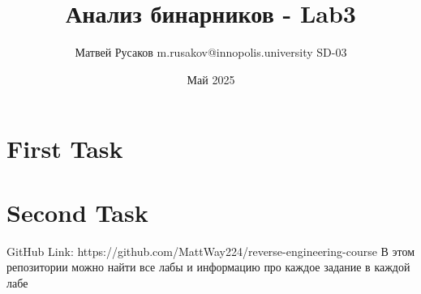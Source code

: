 \usepackage{hyperref}
\usepackage[utf8]{inputenc}
\usepackage[T2A]{fontenc}
\usepackage[top=5cm,bottom=3cm,right=3cm,left=3cm]{geometry}
\usepackage{graphicx}

\title{Анализ бинарников - Lab3}
\author{Матвей Русаков m.rusakov@innopolis.university SD-03}
\date{Май 2025}



    \maketitle


    \section{First Task}
    


    \section{Second Task}
    

    \begin{thebibliography}{1}
        GitHub Link: https://github.com/MattWay224/reverse-engineering-course
        В этом репозитории можно найти все лабы и информацию про каждое задание в каждой лабе
    \end{thebibliography}

